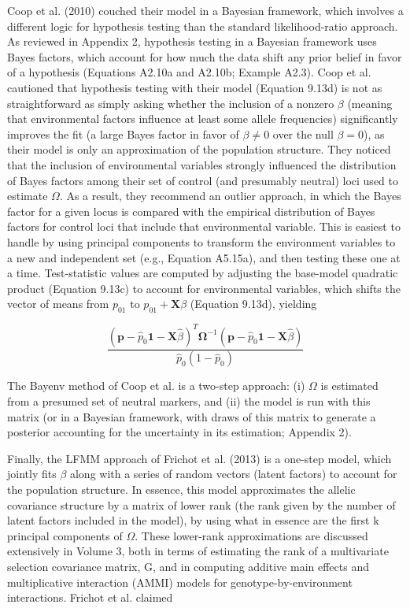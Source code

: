\documentclass{article}
\begin{document}
Coop et al. (2010) couched their model in a Bayesian framework, which involves a different logic for hypothesis testing than the standard likelihood-ratio approach. As reviewed in Appendix 2, hypothesis testing in a Bayesian framework uses Bayes factors, which account for how much the data shift any prior belief in favor of a hypothesis (Equations A2.10a and A2.10b; Example A2.3). Coop et al. cautioned that hypothesis testing with their model (Equation 9.13d) is not as straightforward as simply asking whether the inclusion of a nonzero  $ \beta $ (meaning that environmental factors influence at least some allele frequencies) significantly improves the fit (a large Bayes factor in favor of  $ \beta \neq 0 $ over the null  $ \beta = 0 $), as their model is only an approximation of the population structure. They noticed that the inclusion of environmental variables strongly influenced the distribution of Bayes factors among their set of control (and presumably neutral) loci used to estimate  $ \Omega $. As a result, they recommend an outlier approach, in which the Bayes factor for a given locus is compared with the empirical distribution of Bayes factors for control loci that include that environmental variable. This is easiest to handle by using principal components to transform the environment variables to a new and independent set (e.g., Equation A5.15a), and then testing these one at a time. Test-statistic values are computed by adjusting the base-model quadratic product (Equation 9.13c) to account for environmental variables, which shifts the vector of means from  $ p_01 $ to  $ p_01 + \mathbf{X}\beta $ (Equation 9.13d), yielding

\begin{equation}
\frac{(\mathbf{p}-\widehat{p}_{0}\mathbf{1}-\mathbf{X}\widehat{\beta})^{T}\boldsymbol{\Omega}^{-1}(\mathbf{p}-\widehat{p}_{0}\mathbf{1}-\mathbf{X}\widehat{\beta})}{\widehat{p}_{0}(1-\widehat{p}_{0})}
\tag{9.13e}
\label{eq:9_13e}
\end{equation}

The Bayenv method of Coop et al. is a two-step approach: (i)  $ \Omega $ is estimated from a presumed set of neutral markers, and (ii) the model is run with this matrix (or in a Bayesian framework, with draws of this matrix to generate a posterior accounting for the uncertainty in its estimation; Appendix 2).

Finally, the LFMM approach of Frichot et al. (2013) is a one-step model, which jointly fits  $ \beta $ along with a series of random vectors (latent factors) to account for the population structure. In essence, this model approximates the allelic covariance structure by a matrix of lower rank (the rank given by the number of latent factors included in the model), by using what in essence are the first k principal components of  $ \Omega $. These lower-rank approximations are discussed extensively in Volume 3, both in terms of estimating the rank of a multivariate selection covariance matrix, G, and in computing additive main effects and multiplicative interaction (AMMI) models for genotype-by-environment interactions. Frichot et al. claimed
\end{document}
